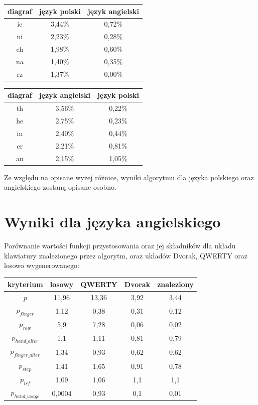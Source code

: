 \documentclass[brudnopis]{xmgr}
\begin{document}
\begin{tabular}{ c | c | c }
  diagraf & język polski & język angielski \\
  \hline
  ie &	3,44\% &	0,72\% \\
  ni &	2,23\% &	0,28\% \\
  ch &	1,98\% &	0,60\% \\
  na &	1,40\% &	0,35\% \\
  rz &	1,37\% &	0,00\% \\
\end{tabular}
\begin{tabular}{ c | c | c }
  diagraf & język angielski & język polski \\
  \hline
  th &	3,56\% &	0,22\% \\
  he &	2,75\% &	0,23\% \\
  in &	2,40\% &	0,44\% \\
  er &	2,21\% &	0,81\% \\
  an &	2,15\% &	1,05\% \\
\end{tabular}\newline

Ze względu na opisane wyżej różnice, wyniki algorytmu dla języka polskiego oraz angielskiego zostaną opisane osobno.


\section{Wyniki dla języka angielskiego}

Porównanie wartości funkcji przystosowania oraz jej składników dla układu klawiatury znalezionego przez algorytm, oraz układów Dvorak, QWERTY oraz losowo wygenerowanego:\newline
\begin{tabular}{ c | c | c | c | c}
  kryterium            & losowy & QWERTY & Dvorak & znaleziony \\
  \hline
  $p$			&  11,96 & 13,36 & 3,92 & 3,44 \\
  \hline
  $p_{finger}$          &   1,12 &  0,38 & 0,31 & 0,12 \\
  $p_{row}$             &    5,9 &  7,28 & 0,06 & 0,02 \\
  $p_{hand\_alter}$     &    1,1 &  1,11 & 0,81 & 0,79 \\
  $p_{finger\_alter}$   &   1,34 &  0,93 & 0,62 & 0,62 \\
  $p_{step}$            &   1,41 &  1,65 & 0,91 & 0,78 \\
  $p_{isf}$             &   1,09 &  1,06 &  1,1 &  1,1 \\
  $p_{hand\_usage}$     & 0,0004 &  0,93 &  0,1 & 0,01 \\
\end{tabular}\newline\newline
\end{document}
